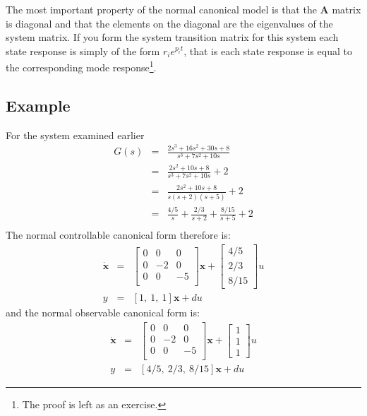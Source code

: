 The most important property of the normal canonical model is that
the $\mathbf{A}$ matrix is diagonal and that the elements on the
diagonal are the eigenvalues of the system matrix. If you form the
system transition matrix for this system each state response is
simply of the form $r_i e^{p_i t}$, that is each state response is
equal to the corresponding mode response\footnote{The proof is
left as an exercise.}.

\subsection*{Example}
For the system examined earlier
\begin{eqnarray*}
G(s) &=& \frac{2s^3 + 16s^2 + 30s + 8}{s^3 + 7s^2 + 10s} \\
 &=&
\frac{2s^2 + 10s + 8}{s^3 + 7s^2 + 10s} + 2 \\
 &=& \frac{2s^2 + 10s + 8}{s(s+2)(s+5)} + 2 \\
 &=& \frac{4/5}{s} + \frac{2/3}{s+2} + \frac{8/15}{s+5} + 2
\\
\end{eqnarray*}
The normal controllable canonical form therefore is:
\begin{eqnarray*}
\mathbf{\dot{x}}&=&\left[\begin{array}{ccc}
  0 & 0 & 0  \\
  0 & -2 & 0  \\
  0 & 0 & -5  \\
 \end{array}\right] \mathbf{x} + \left[\begin{array}{c}
  4/5 \\
  2/3 \\
  8/15
\end{array}\right] u\\ y &=& \left[1,\ 1,\ 1\right] \mathbf{x} + d u
\end{eqnarray*}
and the normal observable canonical form is:
\begin{eqnarray*}
\mathbf{\dot{x}}&=&\left[\begin{array}{ccc}
  0 & 0 & 0  \\
  0 & -2 & 0  \\
  0 & 0 & -5  \\
 \end{array}\right] \mathbf{x} + \left[\begin{array}{c}
  1 \\
  1  \\
  1
\end{array}\right] u\\ y &=& \left[4/5,\ 2/3,\ 8/15\right] \mathbf{x} + d u
\end{eqnarray*}
